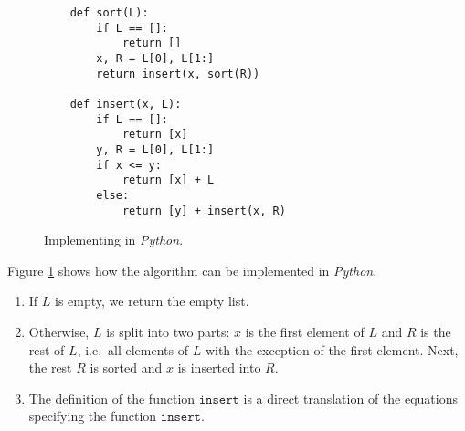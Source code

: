 \begin{figure}[!ht]
  \centering
\begin{verbatim}
    def sort(L):
        if L == []:
            return []
        x, R = L[0], L[1:]
        return insert(x, sort(R))
    
    def insert(x, L):
        if L == []:
            return [x]
        y, R = L[0], L[1:]
        if x <= y:
            return [x] + L
        else:
            return [y] + insert(x, R)
\end{verbatim}
\vspace*{-0.3cm}
  \caption{Implementing  in \textsl{Python}.}
  \label{fig:Insertion-Sort.ipynb}
\end{figure} 

\noindent
Figure \ref{fig:Insertion-Sort.ipynb} shows how the  algorithm can be implemented 
in \textsl{Python}.
\begin{enumerate}
\item If $L$ is empty, we return the empty list.
\item Otherwise, $L$ is split into two parts: $x$ is the first element of $L$ and $R$ is the rest of $L$,
      i.e.~all elements of $L$ with the exception of the first element.  Next, the rest $R$ is sorted and $x$
      is inserted into $R$.
\item The definition of the function $\mathtt{insert}$ is a direct translation of the equations specifying the
      function $\texttt{insert}$.
\end{enumerate}


